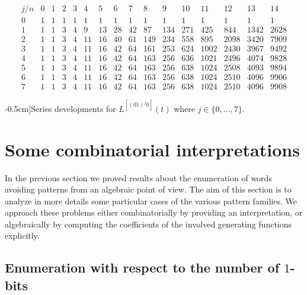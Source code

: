 \begin{table}
\begin{equation*}\begin{array}{c|ccccccccccccccc}j/n & 0 & 1 & 2 & 3 & 4 & 5 & 6 & 7 & 8 & 9 & 10 & 11 & 12 & 13 & 14\\\hline0 & 1 & 1 & 1 & 1 & 1 & 1 & 1 & 1 & 1 & 1 & 1 & 1 & 1 & 1 & 1\\1 & 1 & 1 & 3 & 4 & 9 & 13 & 28 & 42 & 87 & 134 & 271 & 425 & 844 & 1342 & 2628\\2 & 1 & 1 & 3 & 4 & 11 & 16 & 40 & 61 & 149 & 234 & 558 & 895 & 2098 & 3420 & 7909\\3 & 1 & 1 & 3 & 4 & 11 & 16 & 42 & 64 & 161 & 253 & 624 & 1002 & 2430 & 3967 & 9492\\4 & 1 & 1 & 3 & 4 & 11 & 16 & 42 & 64 & 163 & 256 & 636 & 1021 & 2496 & 4074 & 9828\\5 & 1 & 1 & 3 & 4 & 11 & 16 & 42 & 64 & 163 & 256 & 638 & 1024 & 2508 & 4093 & 9894\\6 & 1 & 1 & 3 & 4 & 11 & 16 & 42 & 64 & 163 & 256 & 638 & 1024 & 2510 & 4096 & 9906\\7 & 1 & 1 & 3 & 4 & 11 & 16 & 42 & 64 & 163 & 256 & 638 & 1024 & 2510 & 4096 & 9908\end{array}\end{equation*}
\caption[][-0.5cm]{Series developments for $L^{[(01)^{j}0]}(t)$ where $j\in \lbrace 0,\ldots,7 \rbrace$.}
\label{tbl:L01_j:0}
\end{table}




\section{Some combinatorial interpretations}

In the previous section we proved results about the enumeration of words
avoiding patterns from an algebraic point of view. The aim of this section is
to analyze in more details some particular cases of the various pattern
families. We approach these problems either combinatorially by providing an interpretation, or algebraically by
computing the coefficients of the involved generating functions explicitly.

\subsection{Enumeration with respect to the number of $1$-bits}

